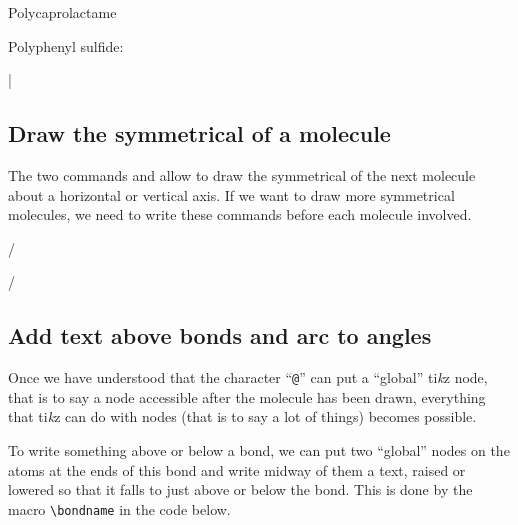 \documentclass[10pt]{article}
\makeatletter
\newcommand\make@car@active[1]{%
	\catcode`#1\active
	\begingroup
		\lccode`\~`#1\relax
		\lowercase{\endgroup\def~}%
}
\newif\if@exstar
\newcommand\exemple{%
	\begingroup
	\parskip\z@
	\@makeother\;\@makeother\!\@makeother\?\@makeother\:%
	\@ifstar{\@exstartrue\exemple@}{\@exstarfalse\exemple@}}
\newcommand\exemple@[2][65]{%
	\medbreak\noindent
	\begingroup
		\let\do\@makeother\dospecials
		\make@car@active\ { {}}%
		\make@car@active\^^M{\par\leavevmode}%
		\make@car@active\^^I{\space\space}%
		\make@car@active\,{\leavevmode\kern\z@\string,}%
		\make@car@active\-{\leavevmode\kern\z@\string-}%
		\make@car@active\>{\leavevmode\kern\z@\string>}%
		\make@car@active\<{\leavevmode\kern\z@\string<}%
		\exemple@@{#1}{#2}%
}
\newcommand\exemple@@[3]{%
	\def\@tempa##1#3{\exemple@@@{#1}{#2}{##1}}%
	\@tempa
}
\newcommand\exemple@@@[3]{%
	\xdef\the@code{#3}%
	\endgroup
	\if@exstar
		\begingroup
			\fboxrule0.4pt
			\let\breakboxparindent\z@
			\def\bkvz@bottom{\hrule\@height\fboxrule}%
			\let\bkvz@before@breakbox\relax
			\def\bkvz@set@linewidth{\advance\linewidth\dimexpr-2\fboxrule-2\fboxsep}%
			\def\bkvz@left{\vrule\@width\fboxrule\hskip\fboxsep}%
			\def\bkvz@right{\hskip\fboxsep\vrule\@width\fboxrule}%
			\def\bkvz@top{\hbox to \hsize{%
				\vrule\@width\fboxrule\@height\fboxrule
				\leaders\bkvz@bottom\hfill
				\sffamily
				\fboxsep\z@
				\colorbox{black}{\kern0.25em\color{white}\footnotesize\lower0.5ex\hbox{\strut#2}\kern0.25em}%
				\leaders\bkvz@bottom\hfill
				\vrule\@width\fboxrule\@height\fboxrule}}%
			\breakbox
				\kern.5ex\relax
				\ttfamily\footnotesize\the@code\par
				\normalfont
				\kern3pt
				\hrule height0.1pt width\linewidth depth0.1pt
				\vskip5pt
				\rightskip0pt plus 1fill
				\everypar{{\color{lightgray}\rlap{\vrule height0.1pt width\linewidth depth0.1pt}}\hskip0pt plus 1fill}%
				\newlinechar`\^^M\everyeof{\noexpand}\scantokens{#3}\par
			\endbreakbox
		\endgroup
	\else
		\vskip0.5ex
		\boxput*(0,1)
			{\fboxsep\z@
			\hbox{\sffamily\colorbox{black}{\leavevmode\kern0.25em{\color{white}\footnotesize\strut#2}\kern0.25em}}%
			}%
			{\fboxsep5pt
			\fbox{%
				$\vcenter{\hsize\dimexpr0.#1\linewidth-\fboxsep-\fboxrule\relax
					\kern5pt\parskip0pt \ttfamily\footnotesize\the@code}%
				\vcenter{\kern5pt\hsize\dimexpr\linewidth-0.#1\linewidth-\fboxsep-\fboxrule\relax
					\everypar{{\color{lightgray}\rlap{\vrule height0.1pt width\dimexpr\linewidth-0.#1\linewidth-\fboxsep-\fboxrule depth0.1pt}}}%
					\footnotesize\newlinechar`\^^M\everyeof{\noexpand}\scantokens{#3}}$%
				}%
			}%
	\fi
	\medbreak
	\endgroup
}
\newcommand\falseverb[1]{{\ttfamily\detokenize\expandafter{\string#1}}}
\newcommand\TIKZ{ti\textit kz\xspace}
\makeatother
\begin{document}
Polycaprolactame
\bigskip

Polyphenyl sulfide:
\bigskip


|

\subsection{Draw the symmetrical of a molecule}\label{retournement}
The two commands \falseverb{\hflipnext} and \falseverb{\vflipnext} allow to draw the symmetrical of the next molecule about a horizontal or vertical axis. If we want to draw more symmetrical molecules, we need to write these commands before each molecule involved.

\exemple{Symmetry}/%

\vflipnext
{}\medskip

\hflipnext
{}/

\subsection{Add text above bonds and arc to angles}
Once we have understood that the character ``\verb-@-'' can put a ``global'' \TIKZ node, that is to say a node accessible after the molecule has been drawn, everything that \TIKZ can do with nodes (that is to say a lot of things) becomes possible.

To write something above or below a bond, we can put two ``global'' nodes on the atoms at the ends of this bond and write midway of them a text, raised or lowered so that it falls to just above or below the bond. This is done by the macro \verb-\bondname- in the code below.
\end{document}

